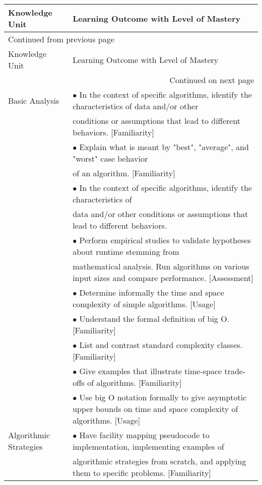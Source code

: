 \documentclass[10pt]{article}
\begin{document}
\small
\begin{longtable}{|p{1.5in}|p{5.25in}|}
\hline
Knowledge Unit & Learning Outcome with Level of Mastery\\
\hline
\endfirsthead
\multicolumn{2}{l}{Continued from previous page} \\
\hline

Knowledge Unit & Learning Outcome with Level of Mastery \\

\hline
\endhead
\hline\multicolumn{2}{r}{Continued on next page} \\
\endfoot
\endlastfoot
\hline
Basic Analysis & \(\bullet\) In the context of specific algorithms, identify the characteristics of data and/or other\\
 & conditions or assumptions that lead to different behaviors. [Familiarity]\\
 & \(\bullet\) Explain what is meant by "best", "average", and "worst" case behavior\\
 & of an algorithm. [Familiarity]\\
 & \(\bullet\) In the context of specific algorithms, identify the characteristics of\\
 & data and/or other conditions or assumptions that lead to different behaviors.\\
 & \(\bullet\) Perform empirical studies to validate hypotheses about runtime stemming from\\
 & mathematical analysis. Run algorithms on various input sizes and compare performance. [Assessment]\\
 & \(\bullet\) Determine informally the time and space complexity of simple algorithms. [Usage]\\
 & \(\bullet\) Understand the formal definition of big O. [Familiarity]\\
 & \(\bullet\) List and contrast standard complexity classes. [Familiarity]\\
 & \(\bullet\) Give examples that illustrate time-space trade-offs of algorithms. [Familiarity]\\
 & \(\bullet\) Use big O notation formally to give asymptotic upper bounds on time and space complexity of algorithms. [Usage]\\
\hline
Algorithmic Strategies & \(\bullet\) Have facility mapping pseudocode to implementation, implementing examples of\\
 & algorithmic strategies from scratch, and applying them to specific problems. [Familiarity]\\

\end{longtable}
\end{document}
